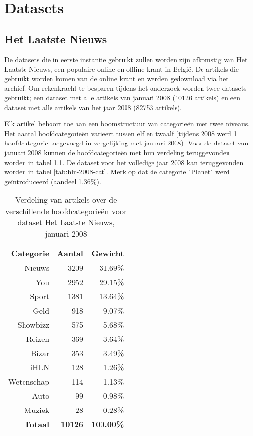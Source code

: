 \chapter{Datasets}
\section{Het Laatste Nieuws}
De datasets die in eerste instantie gebruikt zullen worden zijn afkomstig van Het Laatste Nieuws, een populaire online en offline krant in Belgi\"e. De artikels die gebruikt worden komen van de online krant en werden gedownload via het archief. Om rekenkracht te besparen tijdens het onderzoek worden twee datasets gebruikt; een dataset met alle artikels van januari 2008 (10126 artikels) en een dataset met alle artikels van het jaar 2008 (82753 artikels).

Elk artikel behoort toe aan een boomstructuur van categorie\"en met twee niveaus. Het aantal hoofdcategorie\"en varieert tussen elf en twaalf (tijdens 2008 werd 1 hoofdcategorie toegevoegd in vergelijking met januari 2008). Voor de dataset van januari 2008 kunnen de hoofdcategorie\"en met hun verdeling teruggevonden worden in tabel \ref{tab:hln-2008-01-cat}. De dataset voor het volledige jaar 2008 kan teruggevonden worden in tabel \ref{tab:hln-2008-cat}. Merk op dat de categorie "Planet" werd ge\"introduceerd (aandeel 1.36\%).


\begin{table}[htbp]
	\centering
	\caption{Verdeling van artikels over de verschillende hoofdcategorie\"en voor dataset Het Laatste Nieuws, januari 2008}
	\begin{tabular}{rrr}
		\toprule
		Categorie & Aantal & Gewicht \\
		\midrule
		Nieuws & 3209  & 31.69\% \\
		You   & 2952  & 29.15\% \\
		Sport & 1381  & 13.64\% \\
		Geld  & 918   & 9.07\% \\
		Showbizz & 575   & 5.68\% \\
		Reizen & 369   & 3.64\% \\
		Bizar & 353   & 3.49\% \\
		iHLN  & 128   & 1.26\% \\
		Wetenschap & 114   & 1.13\% \\
		Auto  & 99    & 0.98\% \\
		Muziek & 28    & 0.28\% \\
		\textbf{Totaal} & \textbf{10126} &\textbf{ 100.00\%} \\
		\bottomrule
	\end{tabular}%
	\label{tab:hln-2008-01-cat}%
\end{table}%


